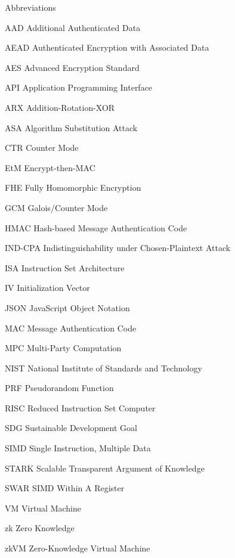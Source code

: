 
\begin{dictionary}{Abbreviations}
\item[AAD] Additional Authenticated Data
\item[AEAD] Authenticated Encryption with Associated Data
\item[AES] Advanced Encryption Standard
\item[API] Application Programming Interface
\item[ARX] Addition-Rotation-XOR
\item[ASA] Algorithm Substitution Attack
\item[CTR] Counter Mode
\item[EtM] Encrypt-then-MAC
\item[FHE] Fully Homomorphic Encryption
\item[GCM] Galois/Counter Mode
\item[HMAC] Hash-based Message Authentication Code
\item[IND-CPA] Indistinguishability under Chosen-Plaintext Attack
\item[ISA] Instruction Set Architecture
\item[IV] Initialization Vector
\item[JSON] JavaScript Object Notation
\item[MAC] Message Authentication Code
\item[MPC] Multi-Party Computation
\item[NIST] National Institute of Standards and Technology
\item[PRF] Pseudorandom Function
\item[RISC] Reduced Instruction Set Computer
\item[SDG] Sustainable Development Goal
\item[SIMD] Single Instruction, Multiple Data
\item[STARK] Scalable Transparent Argument of Knowledge
\item[SWAR] SIMD Within A Register
\item[VM] Virtual Machine
\item[zk] Zero Knowledge
\item[zkVM] Zero-Knowledge Virtual Machine
\end{dictionary}
